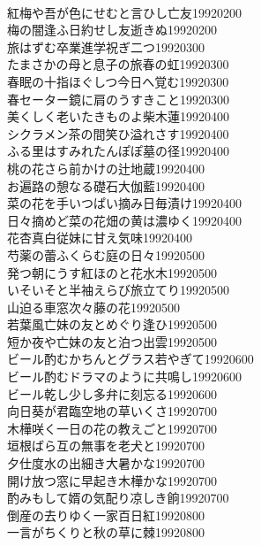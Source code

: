 \begin{multicols}{2}
\\紅梅や吾が色にせむと言ひし亡友\hfill{19920200}
\\梅の闇逢ふ日約せし友逝きぬ\hfill{19920200}
\\旅はずむ卒業進学祝ぎ二つ\hfill{19920300}
\\たまさかの母と息子の旅春の虹\hfill{19920300}
\\春眠の十指ほぐしつ今日へ覚む\hfill{19920300}
\\春セーター鏡に肩のうすきこと\hfill{19920300}
\\美くしく老いたきものよ柴木蓮\hfill{19920400}
\\シクラメン茶の間笑ひ溢れさす\hfill{19920400}
\\ふる里はすみれたんぽぽ墓の径\hfill{19920400}
\\桃の花さら前かけの辻地蔵\hfill{19920400}
\\お遍路の憩なる礎石大伽藍\hfill{19920400}
\\菜の花を手いつぱい摘み日毎漬け\hfill{19920400}
\\日々摘めど菜の花畑の黄は濃ゆく\hfill{19920400}
\\花杏真白従妹に甘え気味\hfill{19920400}
\\芍薬の蕾ふくらむ庭の日々\hfill{19920500}
\\発つ朝にうす紅ほのと花水木\hfill{19920500}
\\いそいそと半袖えらび旅立てり\hfill{19920500}
\\山迫る車窓次々藤の花\hfill{19920500}
\\若葉風亡妹の友とめぐり逢ひ\hfill{19920500}
\\短か夜や亡妹の友と泊つ出雲\hfill{19920500}
\\ビール酌むかちんとグラス若やぎて\hfill{19920600}
\\ビール酌むドラマのように共鳴し\hfill{19920600}
\\ビール乾し少し多弁に刻忘る\hfill{19920600}
\\向日葵が君臨空地の草いくさ\hfill{19920700}
\\木樺咲く一日の花の教えごと\hfill{19920700}
\\垣根ばら互の無事を老犬と\hfill{19920700}
\\夕仕度水の出細き大暑かな\hfill{19920700}
\\開け放つ窓に早起き木樺かな\hfill{19920700}
\\酌みもして婿の気配り凉しき餉\hfill{19920700}
\\倒産の去りゆく一家百日紅\hfill{19920800}
\\一言がちくりと秋の草に棘\hfill{19920800}

\end{multicols}
